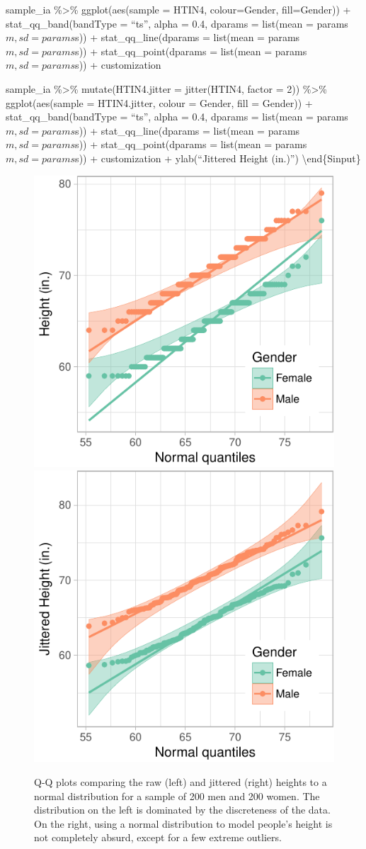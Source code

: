sample\_ia \%\textgreater{}\% ggplot(aes(sample = HTIN4, colour=Gender,
fill=Gender)) + stat\_qq\_band(bandType = ``ts'', alpha = 0.4, dparams =
list(mean = params\(m, sd = params\)s)) + stat\_qq\_line(dparams =
list(mean = params\(m, sd = params\)s)) + stat\_qq\_point(dparams =
list(mean = params\(m, sd = params\)s)) + customization

sample\_ia \%\textgreater{}\% mutate(HTIN4.jitter = jitter(HTIN4, factor
= 2)) \%\textgreater{}\% ggplot(aes(sample = HTIN4.jitter, colour =
Gender, fill = Gender)) + stat\_qq\_band(bandType = ``ts'', alpha = 0.4,
dparams = list(mean = params\(m, sd = params\)s)) +
stat\_qq\_line(dparams = list(mean = params\(m, sd = params\)s)) +
stat\_qq\_point(dparams = list(mean = params\(m, sd = params\)s)) +
customization + ylab(``Jittered Height (in.)'')
\textbackslash{}end\{Sinput\}

\begin{figure}

{\centering \includegraphics[width=0.4\linewidth]{loy-figures/heights-1} \includegraphics[width=0.4\linewidth]{loy-figures/heights-2} 

}

\caption[Q-Q plots comparing the raw (left) and jittered (right) heights to a normal distribution for a sample of 200 men and 200 women]{Q-Q plots comparing the raw (left) and jittered (right) heights to a normal distribution for a sample of 200 men and 200 women. The distribution on the left is dominated by the discreteness of the data. On the right, using a normal distribution to model people's height is not completely absurd, except for a few extreme outliers.}\label{fig:heights}
\end{figure}

